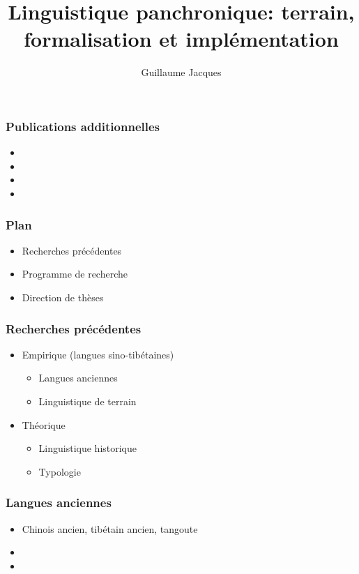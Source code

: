 \documentclass[xcolor=table]{beamer}
\begin{document}
 \title{Linguistique panchronique: terrain, formalisation et implémentation}
 \author{Guillaume Jacques}
 \date{}
 \maketitle


 \begin{frame} 
 \frametitle{Publications additionnelles}
 
   
\begin{itemize}
\item  {}  
\item  {}
\item  {}
\item  {}
\end{itemize}
 \end{frame}
 
    \begin{frame} 
 \frametitle{Plan} 
 
 \begin{itemize}
\item  Recherches précédentes
\item  Programme de recherche
\item  Direction de thèses
\end{itemize}
   \end{frame} 
 
 
   \begin{frame} 
 \frametitle{Recherches précédentes} 
 \begin{itemize}%
\item   Empirique (langues sino-tibétaines)
\begin{itemize}
\item Langues anciennes
\item Linguistique de terrain 
\end{itemize}
\item   Théorique
\begin{itemize}
\item Linguistique historique
\item Typologie
\end{itemize}
\end{itemize}
   \end{frame} 
   
   \begin{frame} 
 \frametitle{Langues anciennes} 
 \begin{itemize}%
\item Chinois ancien, tibétain ancien, tangoute
\item {}  
\item {}  
\end{itemize}
   \end{frame} 
   
\end{document}
